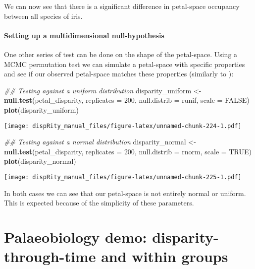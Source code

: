 \documentclass[
]{book}
\newenvironment{Shaded}{\begin{snugshade}}{\end{snugshade}}
\newcommand{\CommentTok}[1]{\textcolor[rgb]{0.56,0.35,0.01}{\textit{#1}}}
\newcommand{\DataTypeTok}[1]{\textcolor[rgb]{0.13,0.29,0.53}{#1}}
\newcommand{\DecValTok}[1]{\textcolor[rgb]{0.00,0.00,0.81}{#1}}
\newcommand{\KeywordTok}[1]{\textcolor[rgb]{0.13,0.29,0.53}{\textbf{#1}}}
\newcommand{\NormalTok}[1]{#1}
\newcommand{\OtherTok}[1]{\textcolor[rgb]{0.56,0.35,0.01}{#1}}
\newcommand{\StringTok}[1]{\textcolor[rgb]{0.31,0.60,0.02}{#1}}
\begin{document}
We can now see that there is a significant difference in petal-space occupancy between all species of iris.

\hypertarget{setting-up-a-multidimensional-null-hypothesis}{%
\subsubsection{Setting up a multidimensional null-hypothesis}\label{setting-up-a-multidimensional-null-hypothesis}}

One other series of test can be done on the shape of the petal-space.
Using a MCMC permutation test we can simulate a petal-space with specific properties and see if our observed petal-space matches these properties (similarly to \citet{diaz2016global}):

\begin{Shaded}
\begin{Highlighting}[]
\CommentTok{\#\# Testing against a uniform distribution}
\NormalTok{disparity\_uniform \textless{}{-}}\StringTok{ }\KeywordTok{null.test}\NormalTok{(petal\_disparity, }\DataTypeTok{replicates =} \DecValTok{200}\NormalTok{,}
    \DataTypeTok{null.distrib =}\NormalTok{ runif, }\DataTypeTok{scale =} \OtherTok{FALSE}\NormalTok{)}
\KeywordTok{plot}\NormalTok{(disparity\_uniform)}
\end{Highlighting}
\end{Shaded}

\texttt{[image: dispRity\_manual\_files/figure-latex/unnamed-chunk-224-1.pdf]}

\begin{Shaded}
\begin{Highlighting}[]
\CommentTok{\#\# Testing against a normal distribution}
\NormalTok{disparity\_normal \textless{}{-}}\StringTok{ }\KeywordTok{null.test}\NormalTok{(petal\_disparity, }\DataTypeTok{replicates =} \DecValTok{200}\NormalTok{,}
    \DataTypeTok{null.distrib =}\NormalTok{ rnorm, }\DataTypeTok{scale =} \OtherTok{TRUE}\NormalTok{)}
\KeywordTok{plot}\NormalTok{(disparity\_normal)}
\end{Highlighting}
\end{Shaded}

\texttt{[image: dispRity\_manual\_files/figure-latex/unnamed-chunk-225-1.pdf]}

In both cases we can see that our petal-space is not entirely normal or uniform.
This is expected because of the simplicity of these parameters.

\hypertarget{palaeobiology-demo-disparity-through-time-and-within-groups}{%
\chapter{Palaeobiology demo: disparity-through-time and within groups}\label{palaeobiology-demo-disparity-through-time-and-within-groups}}
\end{document}
